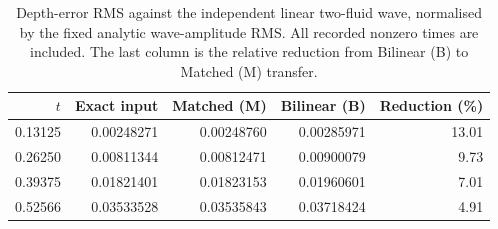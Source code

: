 \begin{table}[htbp]\centering\small
\caption{Depth-error RMS against the independent linear two-fluid wave,
normalised by the fixed analytic wave-amplitude RMS. All recorded
nonzero times are included. The last column is the relative reduction
from Bilinear (B) to Matched (M) transfer.}
\label{tab:physical-wave}
\begin{tabular}{rrrrr}\toprule
$t$ & Exact input & Matched (M) & Bilinear (B) & Reduction (\%)\\\midrule
0.13125 & 0.00248271 & 0.00248760 & 0.00285971 & 13.01\\
0.26250 & 0.00811344 & 0.00812471 & 0.00900079 & 9.73\\
0.39375 & 0.01821401 & 0.01823153 & 0.01960601 & 7.01\\
0.52566 & 0.03533528 & 0.03535843 & 0.03718424 & 4.91\\
\bottomrule\end{tabular}
\end{table}
